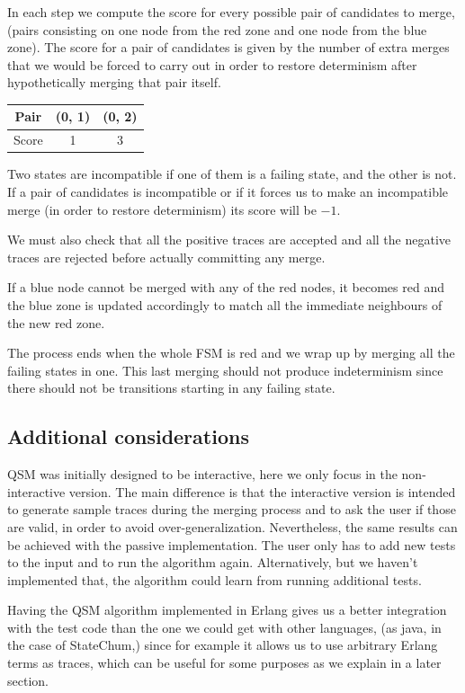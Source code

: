 \documentclass[]{sigplanconf}
\begin{document}
In each step we compute the score for every possible pair of candidates
to merge, (pairs consisting on one node from the red zone and one node from the blue zone).
The score for a pair of candidates is given by the number of extra
merges that we would be forced to carry out in order to restore determinism after
hypothetically merging that pair itself.

\begin{center}
\begin{tabular}{c||c|c}
Pair & (0, 1) & (0, 2)\\\hline\hline
Score & 1 & 3
\end{tabular}
\end{center}

Two states are incompatible if one of them is a failing state, and
the other is not. If a pair of candidates is incompatible or if
it forces us to make an incompatible merge (in order to restore determinism)
its score will be $-1$.

We must also check that all the positive traces are accepted and
all the negative traces are rejected before actually committing
any merge.

If a blue node cannot be merged with any of the red nodes,
it becomes red and the blue zone is updated accordingly to
match all the immediate neighbours of the new red zone.

The process ends when the whole FSM is red and we wrap up by
merging all the failing states in one. This last merging should
not produce indeterminism since there should not be transitions
starting in any failing state.

\subsection{Additional considerations}

QSM was initially designed to be interactive, here we only
focus in the non-interactive version. The main difference is that the interactive
version is intended to generate sample traces during the merging process and to ask
the user if those are valid, in order to avoid over-generalization.
Nevertheless, the same results can be achieved with the passive
implementation. The user only has to add new tests to the input
and to run the algorithm again. Alternatively, but we haven't implemented that,
the algorithm could learn from running additional tests.

Having the QSM algorithm implemented in Erlang
gives us a better integration with the test code than the one we could
get with other languages, (as java, in the case of StateChum,) since for
example it allows us to use arbitrary Erlang terms as traces, which can
be useful for some purposes as we explain in a later section.
\end{document}
